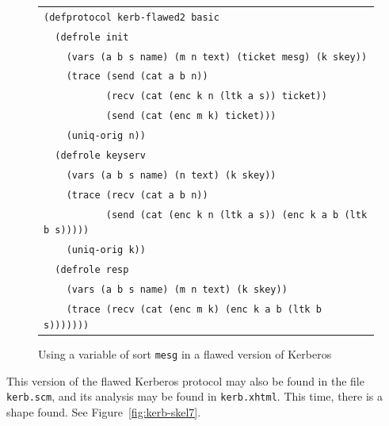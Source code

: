 \begin{figure}
\begin{center}
\begin{tabular}{l}
\verb|(defprotocol kerb-flawed2 basic|\\
\verb|  (defrole init|\\
\verb|    (vars (a b s name) (m n text) (ticket mesg) (k skey))|\\
\verb|    (trace (send (cat a b n))|\\
\verb|           (recv (cat (enc k n (ltk a s)) ticket))|\\
\verb|           (send (cat (enc m k) ticket)))|\\
\verb|    (uniq-orig n))|\\
\verb|  (defrole keyserv|\\
\verb|    (vars (a b s name) (n text) (k skey))|\\
\verb|    (trace (recv (cat a b n))|\\
\verb|           (send (cat (enc k n (ltk a s)) (enc k a b (ltk b s)))))|\\
\verb|    (uniq-orig k))|\\
\verb|  (defrole resp|\\
\verb|    (vars (a b s name) (m n text) (k skey))|\\
\verb|    (trace (recv (cat (enc m k) (enc k a b (ltk b s)))))))|\\
\end{tabular}
\end{center}
\caption[Flawed Kerberos with a generic ticket]{Using a variable of
  sort \texttt{mesg} in a flawed version of Kerberos}
\label{fig:kerb-flawed2 defprotocol}
\end{figure}

This version of the flawed Kerberos protocol may also be found in the
file \texttt{kerb.scm}, and its analysis may be found in
\texttt{kerb.xhtml}.  This time, there is a shape found.  See
Figure~\ref{fig:kerb-skel7}.

